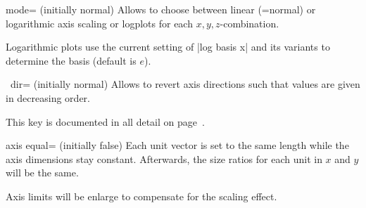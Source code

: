 \begin{pgfplotsxykey}{\x mode= (initially normal)}
	Allows to choose between linear (=normal) or logarithmic axis scaling or logplots for each $x,y,z$-combination.

	Logarithmic plots use the current setting of |log basis x| and its variants to determine the basis (default is $e$).
\end{pgfplotsxykey}

{\def\pgfmanualpdflabel#1#2{}
\begin{pgfplotsxykey}{\x\ dir= (initially normal)}
	Allows to revert axis directions such that values are given in decreasing order.

	This key is documented in all detail on page~\pageref{key:pgfplots:xydir}.
\end{pgfplotsxykey}
}

\begin{pgfplotskey}{axis equal= (initially false)}
	Each unit vector is set to the same length while the axis dimensions stay constant. Afterwards, the size ratios for each unit in $x$ and $y$ will be the same.
	
	Axis limits will be enlarge to compensate for the scaling effect.
\begin{codeexample}[]
\hspace{1cm}
\end{codeexample}
	
\begin{codeexample}[]
\hspace{1cm}
\end{codeexample}
\end{pgfplotskey}

